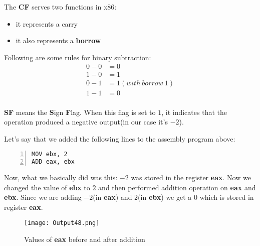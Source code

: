 \documentclass{article}
\begin{document}
The \textbf{CF} serves two functions in x86:
\begin{itemize}
\item it represents a carry
\item it also represents a \textbf{borrow}
\end{itemize}

Following are some rules for binary subtraction:
\begin{align*}
0 - 0 &= 0 \\
1 - 0 &= 1 \\
0 - 1 &= 1(with\ borrow\ 1) \\
1 - 1 &= 0 \\
\end{align*}

\vspace{10pt}
\textbf{SF} means the \textbf{S}ign \textbf{F}lag. When this flag is set to $1$, it indicates that the operation produced a negative output(in our case it's $-2$).

Let's say that we added the following lines to the assembly program above:
\begin{Verbatim}[numbers=left, frame=single]
MOV ebx, 2
ADD eax, ebx
\end{Verbatim}
\newpage
Now, what we basically did was this: $-2$ was stored in the register \textbf{eax}. Now we changed the value of \textbf{ebx} to $2$ and then performed addition operation on \textbf{eax} and \textbf{ebx}. Since we are adding $-2$(in \textbf{eax}) and $2$(in \textbf{ebx}) we get a $0$ which is stored in register \textbf{eax}.

\begin{figure}[h]
\centering
\texttt{[image: Output48.png]}
\caption{Values of \textbf{eax} before and after addition}
\label{fig:fig4}
\end{figure}
\end{document}
